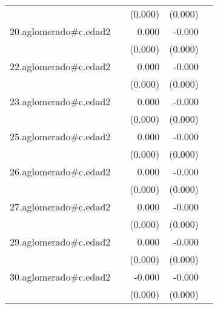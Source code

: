 {\begin{longtable}{l*{4}{D{.}{.}{-1}}}
            &                     &     (0.000)         &     (0.000)         &                     \\
\addlinespace
20.aglomerado#c.edad2&                     &       0.000         &      -0.000         &                     \\
            &                     &     (0.000)         &     (0.000)         &                     \\
\addlinespace
22.aglomerado#c.edad2&                     &       0.000         &      -0.000         &                     \\
            &                     &     (0.000)         &     (0.000)         &                     \\
\addlinespace
23.aglomerado#c.edad2&                     &       0.000         &      -0.000         &                     \\
            &                     &     (0.000)         &     (0.000)         &                     \\
\addlinespace
25.aglomerado#c.edad2&                     &       0.000         &      -0.000         &                     \\
            &                     &     (0.000)         &     (0.000)         &                     \\
\addlinespace
26.aglomerado#c.edad2&                     &       0.000\sym{*}  &      -0.000         &                     \\
            &                     &     (0.000)         &     (0.000)         &                     \\
\addlinespace
27.aglomerado#c.edad2&                     &       0.000         &      -0.000         &                     \\
            &                     &     (0.000)         &     (0.000)         &                     \\
\addlinespace
29.aglomerado#c.edad2&                     &       0.000         &      -0.000\sym{*}  &                     \\
            &                     &     (0.000)         &     (0.000)         &                     \\
\addlinespace
30.aglomerado#c.edad2&                     &      -0.000         &      -0.000\sym{**} &                     \\
            &                     &     (0.000)         &     (0.000)         &                     \\

\end{longtable}}
